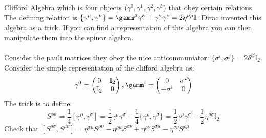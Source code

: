 \documentclass[12pt, a4paper, twoside, titlepage]{article}
\begin{document}
                Clifford Algebra which is four objects ($\gamma^0, \gamma^1, \gamma^2, \gamma^3$) that obey certain relations. The defining relation is $\{\gamma^{\mu}, \gamma^{\nu} \} = \gamm^{\mu} \gamma^{\nu} + \gamma^{\nu}\gamma^{\nu} = 2 \eta^{\nu \mu} \mathbb{I}$. Dirac invented this algebra as a trick. If you can find a representation of this algebra you can then manipulate them into the spinor algebra.\\\\
                Consider the pauli matrices they obey the nice anticommuniator: $\{\sigma^i, \sigma^j \} = 2 \delta^{ij} \mathbb{I}_2$.  Consider the simple representation of the clifford algebra as:
                $$
                        \gamma^0 = \begin{pmatrix} 0 & \mathbb{I}_2\\
                                \mathbb{I}_2 & 0 \end{pmatrix}, \gamm^i = \begin{pmatrix} 0 & \sigma^i \\
                        - \sigma^i & 0 \end{pmatrix}
                $$
                The trick is to define:
                $$
                S^{\rho \sigma} = \frac{1}{4}[ \gamma^{\rho}, \gamma^{\sigma}] = \frac{1}{2} \gamma^{\rho} \gamma^{\sigma} - \frac{1}{4} \{ \gamma^{\rho}, \gamma^{\sigma} \} = \frac{1}{2} \gamma^{\rho} \gamma^{\sigma} - \frac{1}{2} \eta^{\rho \sigma} \mathbb{I}_2
                $$
                Check that $[ S^{\rho \sigma},S^{\mu \nu}] =\eta^{\sigma \mu}S^{\rho \nu} - \eta^{\rho \mu} S^{\sigma \nu} + \eta^{\rho \nu}S^{\sigma \mu} - \eta^{\sigma \nu} S^{\rho \mu}$ 
\end{document}

